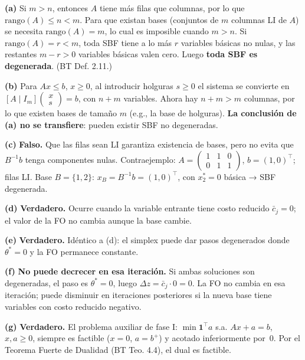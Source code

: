 \documentclass[12pt]{article}
\theoremstyle{plain}
\begin{document}
\begin{solucion}

\noindent\textbf{(a)} Si $m > n$, entonces $A$ tiene más filas que columnas, por lo que $\text{rango}(A) \leq n < m$. Para que existan bases (conjuntos de $m$ columnas LI de $A$) se necesita $\text{rango}(A) = m$, lo cual es imposible cuando $m > n$. Si $\text{rango}(A) = r < m$, toda SBF tiene a lo más $r$ variables básicas no nulas, y las restantes $m - r > 0$ variables básicas valen cero. Luego \textbf{toda SBF es degenerada}. (BT Def. 2.11.)

\noindent\textbf{(b)} Para $Ax \leq b$, $x \geq 0$, al introducir holguras $s \geq 0$ el sistema se convierte en $[A \mid I_m]\begin{pmatrix}x\\s\end{pmatrix} = b$, con $n+m$ variables. Ahora hay $n+m > m$ columnas, por lo que existen bases de tamaño $m$ (e.g., la base de holguras). \textbf{La conclusión de (a) no se transfiere}: pueden existir SBF no degeneradas.

\noindent\textbf{(c)} \textbf{Falso.} Que las filas sean LI garantiza existencia de bases, pero no evita que $B^{-1}b$ tenga componentes nulas. Contraejemplo: $A = \begin{pmatrix}1&1&0\\0&1&1\end{pmatrix}$, $b = (1,0)^\top$; filas LI. Base $B=\{1,2\}$: $x_B = B^{-1}b = (1,0)^\top$, con $x_2^* = 0$ básica → SBF degenerada.

\noindent\textbf{(d)} \textbf{Verdadero.} Ocurre cuando la variable entrante tiene costo reducido $\bar{c}_j = 0$; el valor de la FO no cambia aunque la base cambie.

\noindent\textbf{(e)} \textbf{Verdadero.} Idéntico a (d): el simplex puede dar pasos degenerados donde $\theta^* = 0$ y la FO permanece constante.

\noindent\textbf{(f)} \textbf{No puede decrecer en esa iteración.} Si ambas soluciones son degeneradas, el paso es $\theta^* = 0$, luego $\Delta z = \bar{c}_j \cdot 0 = 0$. La FO no cambia en esa iteración; puede disminuir en iteraciones posteriores si la nueva base tiene variables con costo reducido negativo.

\noindent\textbf{(g)} \textbf{Verdadero.} El problema auxiliar de fase I: $\min \mathbf{1}^\top a$ s.a. $Ax + a = b$, $x,a \geq 0$, siempre es factible ($x=0$, $a=b^+$) y acotado inferiormente por~0. Por el Teorema Fuerte de Dualidad (BT Teo. 4.4), el dual es factible.

\end{solucion}
\end{document}
